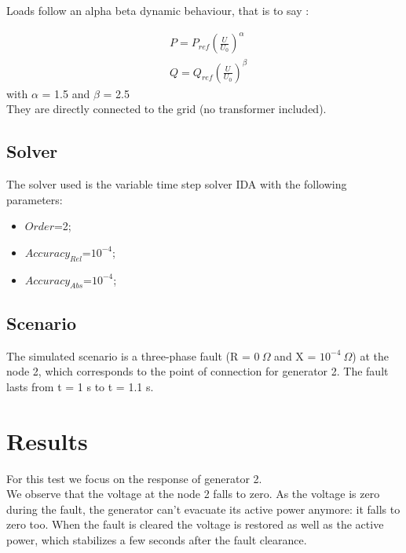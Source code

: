 \documentclass[a4paper, 12pt]{report}
\begin{document}
Loads follow an alpha beta dynamic behaviour, that is to say :

\[
\begin{aligned}
& P = P_{ref} (\frac{U}{U_{0}})^\alpha \\
& Q = Q_{ref} (\frac{U}{U_{0}})^\beta
\end{aligned}
\]
with $\alpha$ = 1.5 and $\beta$ = 2.5 \\
They are directly connected to the grid (no transformer included).


\subsection{Solver}
The solver used is the variable time step solver IDA with the following parameters:
\begin{itemize}
\item $Order$=2;
\item $Accuracy_{Rel}$=$10^{-4}$;
\item $Accuracy_{Abs}$=$10^{-4}$;
\end{itemize}

\subsection{Scenario}
The simulated scenario is a three-phase fault (R = $0 \ \Omega$ and X = $10^{-4} \ \Omega$) at the node 2, which corresponds to the point of connection for generator 2. The fault lasts from t = 1 s to t = 1.1 s.

\newpage
\section{Results}

For this test we focus on the response of generator 2.\\

We observe that the voltage at the node 2 falls to zero. As the voltage is zero during the fault, the generator can't evacuate its active power anymore: it falls to zero too. When the fault is cleared the voltage is restored as well as the active power, which stabilizes a few seconds after the fault clearance.\\
\end{document}
